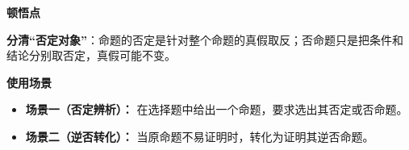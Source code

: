 \begin{explanationbox}
	\medskip
	\textbf{\textcolor{CExplanation}{顿悟点}}

	\textbf{分清“否定对象”}：命题的否定是针对整个命题的真假取反；否命题只是把条件和结论分别取否定，真假可能不变。

	\medskip
	\textbf{\textcolor{CExplanation}{使用场景}}
	\begin{itemize}[leftmargin=*, itemsep=0.5em, topsep=0.4em]
		\item \textbf{场景一（否定辨析）：} 在选择题中给出一个命题，要求选出其否定或否命题。
		\item \textbf{场景二（逆否转化）：} 当原命题不易证明时，转化为证明其逆否命题。
	\end{itemize}
\end{explanationbox}
